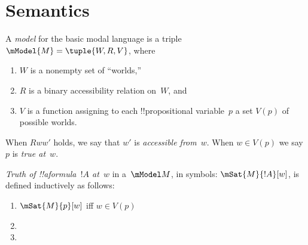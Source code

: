 \documentclass[../../../../include/open-logic-chapter]{subfiles}
\begin{document}

\section{Semantics}

\begin{defn}
  A \emph{model} for the basic modal language is a triple $\mModel{M}
  = \tuple{W, R, V}$, where
  \begin{enumerate}
  \item $W$ is a nonempty set of ``worlds,''
  \item $R$ is a binary accessibility relation on~$W$, and
  \item $V$ is a function assigning to each !!{propositional
    variable}~$p$ a set $V(p)$ of possible worlds.
  \end{enumerate}
  When $Rww'$ holds, we say that $w'$ is \emph{accessible
    from}~$w$. When $w \in V(p)$ we say $p$ is \emph{true at}~$w$.
\end{defn}

\begin{defn}
  \emph{Truth of !!a{formula}~$!A$ at~$w$} in a~$\mModel M$, in symbols:
  $\mSat{M}{!A}[w]$, is defined inductively as follows:
  \begin{enumerate}
  \item $\mSat{M}{p}[w]$ iff $w \in V(p)$
  \item{}
  \item{}
  \end{enumerate}
\end{defn}
\end{document}
